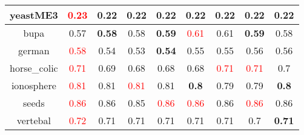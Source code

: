 \documentclass{article}%
\begin{document}
\begin{tabular}{c|cccccccc}
\hline%
yeastME3&\textcolor{red}{ 
0.23
}&0.22&0.22&0.22&0.22&0.22&0.22&0.22\\%
\hline%
bupa&0.57&\textbf{0.58}&0.58&\textbf{0.59}&\textcolor{red}{ 
0.61
}&0.61&\textbf{0.59}&0.58\\%
\hline%
german&\textcolor{red}{ 
0.58
}&0.54&0.53&\textbf{0.54}&0.55&0.55&0.56&0.56\\%
\hline%
horse\_colic&\textcolor{red}{ 
0.71
}&0.69&0.68&0.68&0.68&\textcolor{red}{ 
0.71
}&\textcolor{red}{ 
0.71
}&0.7\\%
\hline%
ionosphere&\textcolor{red}{ 
0.81
}&0.81&\textcolor{red}{ 
0.81
}&0.81&\textbf{0.8}&0.79&0.79&\textbf{0.8}\\%
\hline%
seeds&\textcolor{red}{ 
0.86
}&0.86&0.85&\textcolor{red}{ 
0.86
}&\textcolor{red}{ 
0.86
}&0.86&\textcolor{red}{ 
0.86
}&0.86\\%
\hline%
vertebal&\textcolor{red}{ 
0.72
}&0.71&0.71&0.71&0.71&0.71&0.7&\textbf{0.71}\\%
\hline%
\end{tabular}

%
\end{document}
